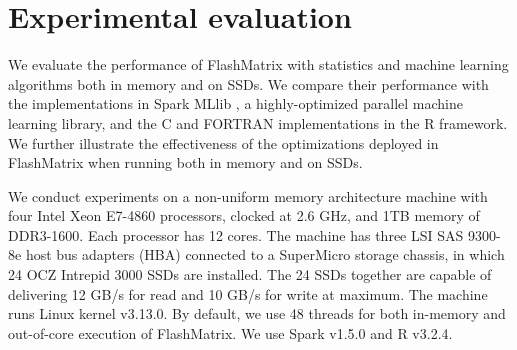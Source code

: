 \section{Experimental evaluation}
We evaluate the performance of FlashMatrix with statistics and machine learning
algorithms both in memory and on SSDs. We compare their performance with
the implementations in Spark MLlib \cite{mllib}, a highly-optimized parallel
machine learning library, and the C and FORTRAN implementations in the R framework.
We further illustrate the effectiveness of the optimizations deployed in
FlashMatrix when running both in memory and on SSDs.

We conduct experiments on a non-uniform memory architecture machine with
four Intel Xeon E7-4860 processors, clocked at 2.6 GHz, and 1TB memory of
DDR3-1600. Each processor has 12 cores. The machine has three LSI SAS 9300-8e
host bus adapters (HBA) connected to a SuperMicro storage chassis, in which
24 OCZ Intrepid 3000 SSDs are installed. The 24 SSDs together are capable of
delivering 12 GB/s for read and 10 GB/s for write at maximum. The machine runs
Linux kernel v3.13.0. By default, we use 48 threads for both in-memory and
out-of-core execution of FlashMatrix. We use Spark v1.5.0 and R v3.2.4.

